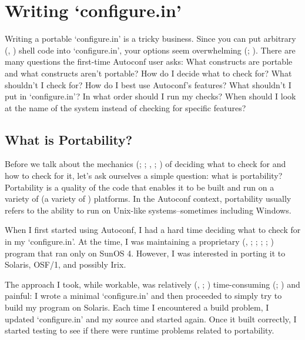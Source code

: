 \chapter{Writing `configure.in'}


Writing a portable `configure.in' is a tricky business. Since you can put 
arbitrary ({\McQ{}}, {\MgQ{}}) shell code into `configure.in', your options 
seem overwhelming ({\MeQ{}}; {\MaQ{}}). There are many questions the first-time Autoconf user asks: What constructs are portable and what constructs aren't portable? How do I decide what to check for? What shouldn't I check for? How do I best use Autoconf's features? What shouldn't I put in `configure.in'? In what order should I run my checks? When should I look at the name of the system instead of checking for specific features? 

\section{What is Portability?}


Before we talk about the mechanics ({\MfQ{}}; {\MfQ{}}; {\MfQ{}}, {\MaQ{}}; {\MbQ{}}) of
deciding what to check for and how to check for it, let's ask ourselves a simple question: what is portability? Portability is a quality of the code that enables it to be built and run on a variety of (a variety of {\McQ{}}) platforms. In the Autoconf context, portability usually refers to the ability to run on Unix-like systems--sometimes including Windows. 


When I first started using Autoconf, I had a hard time deciding what to check for in my `configure.in'. At the time, I was maintaining a
proprietary ({\MhQ{}}, {\MhQ{}}; {\McQ{}}; {\McQ{}}; {\McQ{}}; {\McQ{}})
program that ran only on SunOS 4. However, I was interested in porting it to 
Solaris, OSF/1, and possibly Irix. 


The approach I took, while workable, was relatively ({\MbQ{}}, {\MbQ{}}; {\MbQ{}})
time-consuming ({\McQ{}}; {\MlQ{}}) and painful: I wrote a minimal `configure.in' and then proceeded to simply try to build my program on Solaris. Each time I encountered a build problem, I updated `configure.in' and my source and started again. Once it built correctly, I started testing to see if there were runtime problems related to portability. 


